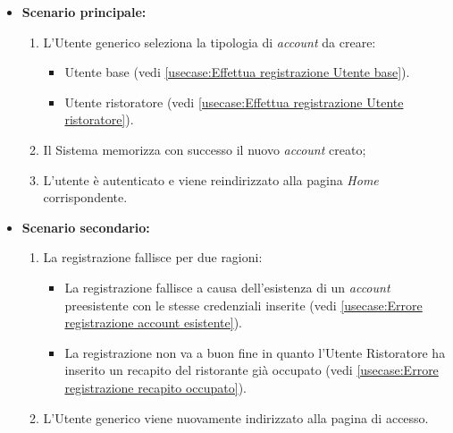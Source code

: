 \begin{itemize}
	\item \textbf{Scenario principale:}
	      \begin{enumerate}
		      \item L'Utente generico seleziona la tipologia di \textit{account} da creare: 
		      \begin{itemize}
				\item Utente base (vedi \autoref{usecase:Effettua registrazione Utente base}).
				\item Utente ristoratore (vedi \autoref{usecase:Effettua registrazione Utente ristoratore}).
			  \end{itemize} 
              \item Il Sistema memorizza con successo il nuovo \textit{account} creato;
		      \item L'utente è autenticato e viene reindirizzato alla pagina \textit{Home} corrispondente.
	      \end{enumerate}
		
    \item \textbf{Scenario secondario:}
                \begin{enumerate}
                    \item La registrazione fallisce per due ragioni:
                    \begin{itemize}
                        \item La registrazione fallisce a causa dell'esistenza di un \textit{account} preesistente con le stesse credenziali inserite (vedi \autoref{usecase:Errore registrazione account esistente}).
                        \item La registrazione non va a buon fine in quanto l'Utente Ristoratore ha inserito un recapito del ristorante già occupato (vedi \autoref{usecase:Errore registrazione recapito occupato}).
                    \end{itemize}
                    \item L'Utente generico viene nuovamente indirizzato alla pagina di accesso.
                \end{enumerate}	
          
\end{itemize}
